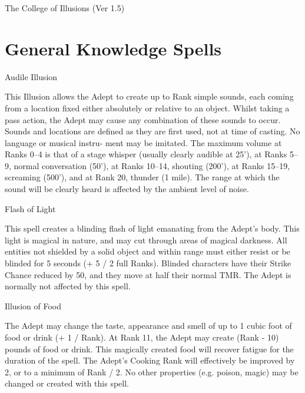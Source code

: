 \begin{Chapter}{The College of Illusions (Ver 1.5)}
\section{General Knowledge Spells}

\begin{spell}[G-1]{Audile Illusion}

\begin{effects}
This Illusion allows the Adept to create up to Rank simple sounds,
each coming from a location fixed either absolutely or relative to an
object.  Whilst taking a pass action, the Adept may cause any
combination of these sounds to occur.  Sounds and locations are
defined as they are first used, not at time of casting.  No language
or musical instru- ment may be imitated.  The maximum volume at Ranks
0--4 is that of a stage whisper (usually clearly audible at 25’), at
Ranks 5--9, normal conversation (50’), at Ranks 10–14, shouting
(200’), at Ranks 15–19, screaming (500’), and at Rank 20, thunder (1
mile). The range at which the sound will be clearly heard is affected
by the ambient level of noise.
\end{effects}
\end{spell}

\begin{spell}[G-2]{Flash of Light}

\begin{effects}
This spell creates a blinding flash of light emanating from the
Adept’s body.  This light is magical in nature, and may cut through
areas of magical darkness.  All entities not shielded by a solid
object and within range must either resist or be blinded for 5 seconds
(+ 5 / 2 full Ranks).  Blinded characters have their Strike Chance
reduced by 50, and they move at half their normal TMR.  The Adept is
normally not affected by this spell.
\end{effects}
\end{spell}

\begin{spell}[G-3]{Illusion of Food}

\begin{effects}
The Adept may change the taste, appearance and smell of up to 1 cubic
foot of food or drink (+ 1 / Rank).  At Rank 11, the Adept may create
(Rank - 10) pounds of food or drink.  This magically created food will
recover fatigue for the duration of the spell.  The Adept’s Cooking
Rank will effectively be improved by 2, or to a minimum of Rank / 2.
No other properties (e.g.  poison, magic) may be changed or created
with this spell.
\end{effects}
\end{spell}


\end{Chapter}
